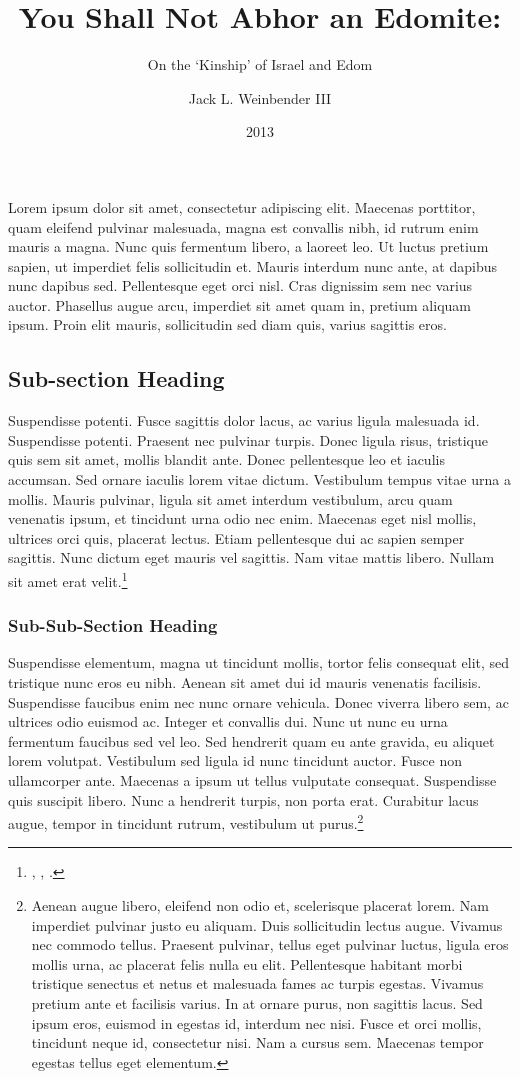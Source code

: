 \documentclass{sblhs-thesis}
\author{Jack L. Weinbender III}
\date{2013}
\title{You Shall Not Abhor an Edomite:}
\subtitle{On the `Kinship' of Israel and Edom}
\begin{document}
	\maketitle

Lorem ipsum dolor sit amet, consectetur adipiscing elit. Maecenas porttitor, quam eleifend pulvinar malesuada, magna est convallis nibh, id rutrum enim mauris a magna. Nunc quis fermentum libero, a laoreet leo. Ut luctus pretium sapien, ut imperdiet felis sollicitudin et. Mauris interdum nunc ante, at dapibus nunc dapibus sed. Pellentesque eget orci nisl. Cras dignissim sem nec varius auctor. Phasellus augue arcu, imperdiet sit amet quam in, pretium aliquam ipsum. Proin elit mauris, sollicitudin sed diam quis, varius sagittis eros.

\subsection*{Sub-section Heading}
Suspendisse potenti. Fusce sagittis dolor lacus, ac varius ligula malesuada id.\autocite{cross:1973a} Suspendisse potenti. Praesent nec pulvinar turpis. Donec ligula risus, tristique quis sem sit amet, mollis blandit ante. Donec pellentesque leo et iaculis accumsan. Sed ornare iaculis lorem vitae dictum. Vestibulum tempus vitae urna a mollis.\autocite{ulrich:2001} Mauris pulvinar, ligula sit amet interdum vestibulum, arcu quam venenatis ipsum, et tincidunt urna odio nec enim. Maecenas eget nisl mollis, ultrices orci quis, placerat lectus. Etiam pellentesque dui ac sapien semper sagittis. Nunc dictum eget mauris vel sagittis. Nam vitae mattis libero. Nullam sit amet erat velit.\footnote{\autocite{bartlett:1969}, \autocite{bartlett:1972}, \autocite{bartlett:1977}.}

\subsubsection{Sub-Sub-Section Heading}
Suspendisse elementum, magna ut tincidunt mollis, tortor felis consequat elit, sed tristique nunc eros eu nibh. Aenean sit amet dui id mauris venenatis facilisis. Suspendisse faucibus enim nec nunc ornare vehicula. Donec viverra libero sem, ac ultrices odio euismod ac. Integer et convallis dui. Nunc ut nunc eu urna fermentum faucibus sed vel leo. Sed hendrerit quam eu ante gravida, eu aliquet lorem volutpat. Vestibulum sed ligula id nunc tincidunt auctor. Fusce non ullamcorper ante. Maecenas a ipsum ut tellus vulputate consequat. Suspendisse quis suscipit libero. Nunc a hendrerit turpis, non porta erat. Curabitur lacus augue, tempor in tincidunt rutrum, vestibulum ut purus.\footnote{Aenean augue libero, eleifend non odio et, scelerisque placerat lorem. Nam imperdiet pulvinar justo eu aliquam. Duis sollicitudin lectus augue. Vivamus nec commodo tellus. Praesent pulvinar, tellus eget pulvinar luctus, ligula eros mollis urna, ac placerat felis nulla eu elit. Pellentesque habitant morbi tristique senectus et netus et malesuada fames ac turpis egestas. Vivamus pretium ante et facilisis varius. In at ornare purus, non sagittis lacus. Sed ipsum eros, euismod in egestas id, interdum nec nisi. Fusce et orci mollis, tincidunt neque id, consectetur nisi. Nam a cursus sem. Maecenas tempor egestas tellus eget elementum.}
\end{document}

